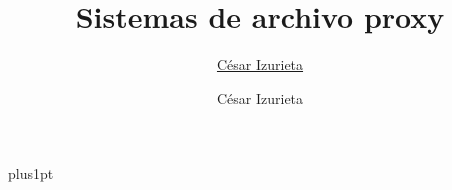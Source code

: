 \documentclass[oneside,12pt]{Classes/CUEDthesisPSnPDF}
\title{Sistemas de archivo proxy}
\author{\href{mailto:cesar@ecuarock.net}{César Izurieta}}
\author{César Izurieta}
\begin{document}

\renewcommand\baselinestretch{1.2}
\baselineskip=18pt plus1pt

%   






\maketitle

\setcounter{secnumdepth}{3}
\setcounter{tocdepth}{3}

\frontmatter

\begin{copyrigth}
\end{copyrigth}





\tableofcontents
\listoffigures


\mainmatter








\appendix







%
%
\renewcommand{\bibname}{Referencias} %
\end{document}
